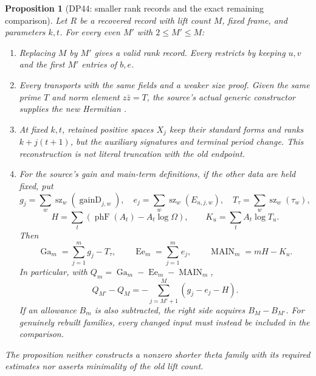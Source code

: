 \documentclass[11pt,a4paper]{article}
\newtheorem{proposition}[theorem]{Proposition}
\theoremstyle{definition}\newtheorem{remark}[theorem]{Remark}
\begin{document}
\begin{proposition}[DP44: smaller rank records and the exact remaining comparison]\label{DP44}
Let $R$ be a recovered  record with lift count $M$, fixed frame, and parameters $k,t$. For every even $M'$ with $2\le M'\le M$:
\begin{enumerate}[label=(\alph*),leftmargin=*]
\item Replacing $M$ by $M'$ gives a valid rank record. Every  restricts by keeping $u,v$ and the first $M'$ entries of $b,e$.
\item Every  transports with the same fields and a weaker size proof. Given the same prime $T$ and norm element $z\bar z=T$, the source's actual generic constructor supplies the new Hermitian .
\item At fixed $k,t$, retained positive spaces $X_j$ keep their standard forms and ranks $k+j(t+1)$, but the auxiliary signatures and terminal period change. This reconstruction is not literal truncation with the old endpoint.
\item For the source's gain and main-term definitions, if the other data are held fixed, put
\[
 g_j=\sum_w\operatorname{sz}_w(\operatorname{gainD}_{j,w}),\quad
 e_j=\sum_w\operatorname{sz}_w(E_{u,j,w}),\quad
 T_\tau=\sum_w\operatorname{sz}_w(\tau_w),
\]
\[
 H=\sum_t(\operatorname{phF}(A_t)-A_t\log\Omega),\qquad
 K_u=\sum_t A_t\log T_u.
\]
Then
\[
 \operatorname{Ga}_m=\sum_{j=1}^m g_j-T_\tau,\qquad
 \operatorname{Ee}_m=\sum_{j=1}^m e_j,\qquad
 \operatorname{MAIN}_m=mH-K_u.
\]
In particular, with $Q_m=\operatorname{Ga}_m-\operatorname{Ee}_m-\operatorname{MAIN}_m$,
\[
 Q_{M'}-Q_M=-\sum_{j=M'+1}^{M}(g_j-e_j-H).
\]
If an allowance $B_m$ is also subtracted, the right side acquires $B_M-B_{M'}$. For genuinely rebuilt families, every changed input must instead be included in the comparison.
\end{enumerate}
The proposition neither constructs a nonzero shorter theta family with its required estimates nor asserts minimality of the old lift count.
\end{proposition}
\end{document}
